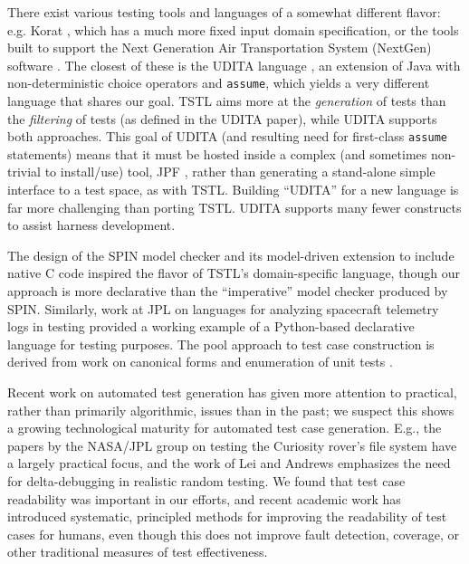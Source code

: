 There exist various testing tools and languages of a somewhat
different flavor: e.g. Korat \cite{Korat}, which has a much more fixed
input domain specification, or the tools built to support the Next
Generation Air Transportation System (NextGen) software
\cite{TameInputs}.  The closest of these is the UDITA language
\cite{UDITA}, an extension of Java with non-deterministic choice
operators and {\tt assume}, which yields a very different language
that shares our goal.  TSTL aims more at the \emph{generation} of
tests than the \emph{filtering} of tests (as defined in the UDITA
paper), while UDITA supports both approaches.  This goal of UDITA (and
resulting need for first-class {\tt assume} statements) means that it
must be hosted inside a complex (and sometimes non-trivial to
install/use) tool, JPF \cite{JPF2}, rather than generating a
stand-alone simple interface to a test space, as with TSTL.  Building
``UDITA'' for a new language is far more challenging than porting
TSTL.  UDITA supports many fewer constructs to assist harness
development.

The design of the SPIN model checker \cite{SPIN} and its model-driven
extension to include native C code \cite{ModelDriven} inspired the
flavor of TSTL's domain-specific language, though our approach is more
declarative than the ``imperative'' model checker produced by SPIN.
Similarly, work at JPL on languages for analyzing spacecraft telemetry
logs in testing \cite{scriptstospecs} provided a working example of a
Python-based declarative language for testing purposes.  The pool
approach to test case construction is derived from work on canonical
forms and enumeration of unit tests \cite{AndrewsTR}.

Recent work on automated test generation has given more attention to
practical, rather than primarily algorithmic, issues
than in the past; we suspect this shows a growing technological
maturity for automated test case generation.  E.g., the papers by the
NASA/JPL group on testing the Curiosity rover's file system
\cite{ICSEDiff,CFV08,AMAI} have a largely practical focus, and the
work of Lei and Andrews \cite{MinUnit} emphasizes the need for
delta-debugging in realistic random testing.  We found
that test case readability was important in our efforts, and recent
academic work \cite{Readable,Guava} has introduced systematic,
principled methods for improving the readability of test cases for
humans, even though this does not improve fault detection, coverage,
or other traditional measures of test effectiveness.

